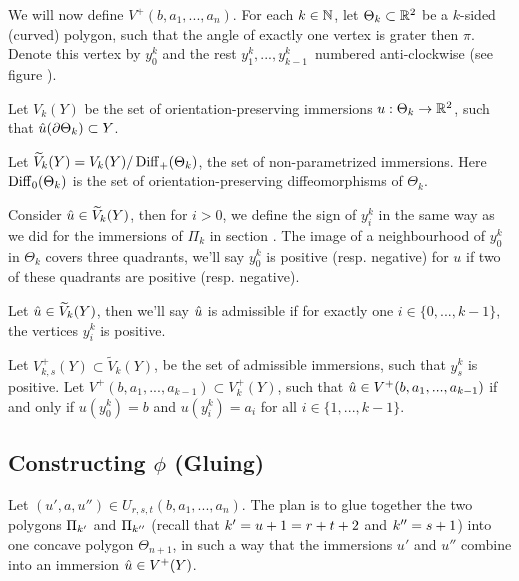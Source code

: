 We will now define $V^+(b,a_1,...,a_n)$. For each $k \in \mathbb{N}$, let $\Theta_k
\subset \mathbb{R}^2$ be a $k$-sided (curved) polygon, such that the angle of exactly
one vertex is grater then $\pi$. Denote this vertex by $y^k_0$ and the rest 
$y^k_1,...,y^k_{k-1}$ numbered anti-clockwise (see figure
).


\begin{defn}
Let $V_k(Y)$ be the set of orientation-preserving immersions $u: \Theta_k \to
\mathbb{R}^2$, such that $\hat{u}(\partial \Theta_k) \subset Y$.

Let $\widetilde{V}_k(Y) = V_k(Y) / \operatorname{Diff}_+(\Theta_k)$, the set of non-parametrized
immersions. Here $\operatorname{Diff}_0(\Theta_k)$ is the set of orientation-preserving
diffeomorphisms of $\Theta_k$.
\end{defn}

Consider $\hat{u} \in \widetilde{V}_k(Y)$, then for $i>0$, we define the sign of $y^k_i$
in the same way as we did for the immersions of $\Pi_k$ in section
. The image of a neighbourhood of $y^k_0$ in
$\Theta_k$ covers three quadrants, we'll say $y^k_0$ is positive (resp.
negative) for $u$ if two of these quadrants are positive (resp. negative).

\begin{defn}
Let $\hat{u} \in \widetilde{V}_k(Y)$, then we'll say $\hat{u}$ is admissible if for exactly one $i
\in \{0,...,k-1\}$,
the vertices $y^k_i$ is positive.

Let $V^+_{k,s}(Y) \subset \tilde{V}_k(Y)$, be the set of admissible immersions,
such that $y^k_s$ is positive. 
Let $V^+(b,a_1,...,a_{k-1}) \subset V^+_k(Y)$, such that $\hat{u}\in
V^+(b,a_1,...,a_{k-1})$
if and only if $u(y^k_0) = b$ and $u(y^k_i) = a_i$ for all $i \in \{ 1,...,k-1
\}$.
\end{defn}

\renewcommand{\r}{\sigma}
\newcommand{\rp}{\sigma'}
\newcommand{\rpp}{\sigma''}

\subsection{Constructing $\phi$ (Gluing)}
Let $(u', a, u'') \in U_{r,s,t}(b, a_1, ..., a_n)$. The plan is to glue together the 
two polygons $\Pi_{k'}$ and $\Pi_{k''}$ (recall that ${k'} = u+1 = r+t+2$ and ${k''}
= s+1$) into one concave polygon
$\Theta_{n+1}$, in such a way that the immersions $u'$ and $u''$ combine into
an immersion $\hat{u} \in V^+(Y)$.

